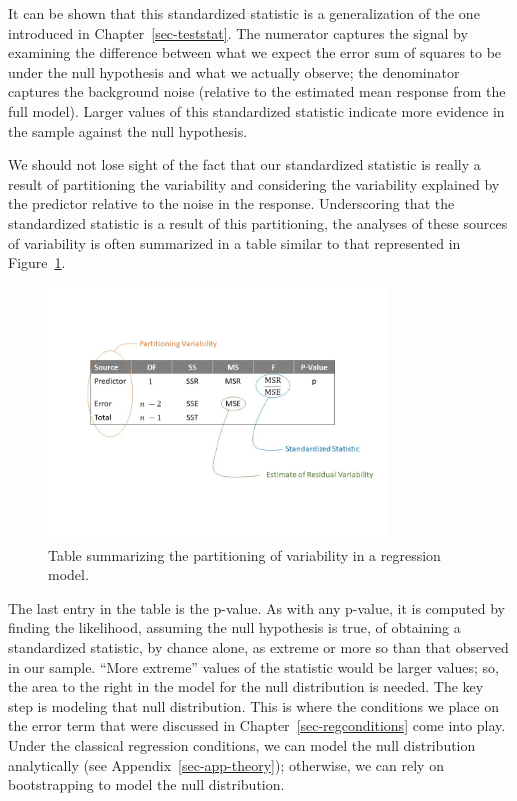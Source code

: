 \documentclass[
  letterpaper,
  DIV=11,
  numbers=noendperiod]{scrreprt}
\theoremstyle{definition}
\theoremstyle{definition}
\theoremstyle{plain}
\theoremstyle{remark}
\begin{document}
It can be shown that this standardized statistic is a generalization of
the one introduced in Chapter~\ref{sec-teststat}. The numerator captures
the signal by examining the difference between what we expect the error
sum of squares to be under the null hypothesis and what we actually
observe; the denominator captures the background noise (relative to the
estimated mean response from the full model). Larger values of this
standardized statistic indicate more evidence in the sample against the
null hypothesis.

We should not lose sight of the fact that our standardized statistic is
really a result of partitioning the variability and considering the
variability explained by the predictor relative to the noise in the
response. Underscoring that the standardized statistic is a result of
this partitioning, the analyses of these sources of variability is often
summarized in a table similar to that represented in
Figure~\ref{fig-regquality-ANOVA-table}.

\begin{figure}

{\centering \includegraphics[width=0.8\textwidth,height=\textheight]{./images/RegQuality-ANOVA-Table.jpg}

}

\caption{\label{fig-regquality-ANOVA-table}Table summarizing the
partitioning of variability in a regression model.}

\end{figure}

The last entry in the table is the p-value. As with any p-value, it is
computed by finding the likelihood, assuming the null hypothesis is
true, of obtaining a standardized statistic, by chance alone, as extreme
or more so than that observed in our sample. ``More extreme'' values of
the statistic would be larger values; so, the area to the right in the
model for the null distribution is needed. The key step is modeling that
null distribution. This is where the conditions we place on the error
term that were discussed in Chapter~\ref{sec-regconditions} come into
play. Under the classical regression conditions, we can model the null
distribution analytically (see Appendix~\ref{sec-app-theory});
otherwise, we can rely on bootstrapping to model the null distribution.
\end{document}
